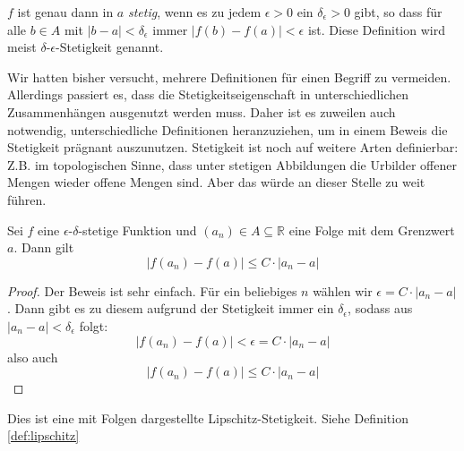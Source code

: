 \begin{definition}
$f$ ist genau dann in $a$ \textsl{stetig}, wenn es zu jedem $\epsilon>0$ ein $\delta_\epsilon > 0$ gibt, so dass für alle $b\in A$ mit $\vert b-a\vert < \delta_\epsilon $ immer $\vert f(b)-f(a)\vert < \epsilon$ ist. Diese Definition wird meist $\delta$-$\epsilon$-Stetigkeit genannt. 
\end{definition}

Wir hatten bisher versucht, mehrere Definitionen für einen Begriff zu vermeiden. Allerdings passiert es, dass die Stetigkeitseigenschaft in unterschiedlichen Zusammenhängen ausgenutzt werden muss. Daher ist es zuweilen auch notwendig, unterschiedliche Definitionen heranzuziehen, um in einem Beweis die Stetigkeit prägnant auszunutzen. Stetigkeit ist noch auf weitere Arten definierbar: Z.B. im topologischen Sinne, dass unter stetigen Abbildungen die Urbilder offener Mengen wieder offene Mengen sind. Aber das würde an dieser Stelle zu weit führen.

\begin{lemma}\label{lem:stetig}
Sei $f$ eine $\epsilon$-$\delta$-stetige Funktion und $(a_n)\in A \subseteq \mathbb{R}$ eine Folge mit dem Grenzwert $a$. Dann gilt
\[
|f(a_n)-f(a)| \le C\cdot |a_n -a|
\]
\end{lemma}
\begin{proof}
Der Beweis ist sehr einfach. Für ein beliebiges $n$ wählen wir $\epsilon = C\cdot |a_n -a|$. Dann gibt es zu diesem aufgrund der Stetigkeit immer ein $\delta_\epsilon$, sodass aus $|a_n-a|<\delta_\epsilon$ folgt:
\[
|f(a_n)-f(a)| < \epsilon = C\cdot |a_n -a|
\]
also auch
\[
|f(a_n)-f(a)| \le C\cdot |a_n -a|
\]
\end{proof}

\begin{remark}
Dies ist eine mit Folgen dargestellte Lipschitz-Stetigkeit. Siehe Definition \ref{def:lipschitz}
\end{remark}


